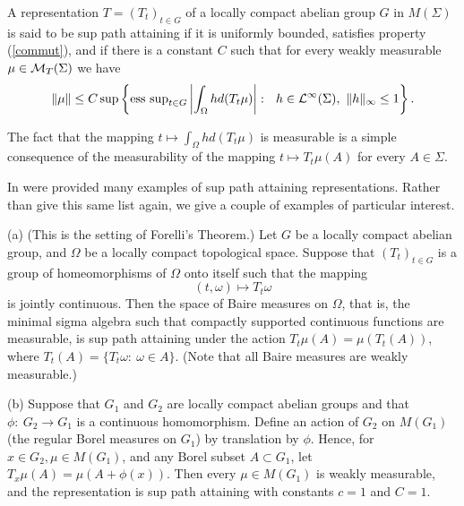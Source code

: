 \documentclass[12pt,leqno]{article}
\def\O{\Omega}
\def\cL{{\cal L}}
\begin{document}
\begin{defin}
A representation $T=(T_t)_{t\in G}$ of a locally compact abelian group
$G$ in $M(\Sigma)$ is said to be sup path attaining
if it is uniformly bounded, satisfies property (\ref{commut}), and if there 
is a constant $C$ such that for every weakly 
measurable $\mu\in {\cal M}_T(\Sigma)$ we have
\begin{equation}
\| \mu\| \leq C\sup \left\{
{\rm ess\ sup}_{t\in G} \left|
\int_\O h d (T_t\mu)
\right|
:\ \ h\in \cL^\infty(\Sigma),\ \|h\|_\infty\leq 1
\right\}.
\label{ineqhypa}
\end{equation}
\label{def hypa}
\end{defin}


The fact that the mapping $t\mapsto \int_\O h d (T_t\mu)$ is 
measurable is a simple consequence of
the measurability of the mapping $t\mapsto T_t\mu(A)$ for every
$A\in\Sigma$.  

In \cite{amss} were provided many examples of sup path attaining
representations.  Rather than give this same list again, we give
a couple of examples of particular interest.

\begin{ex}
{\rm (a) (This is the setting of Forelli's Theorem.)
Let $G$ be a locally compact abelian group, and
$\Omega$ be a locally compact topological
space.  Suppose that $\left( T_t\right)_{t\in G}$ is a
group of homeomorphisms of $\Omega$ onto itself
such that the mapping
$$(t,\omega)\mapsto T_t\omega$$
is jointly continuous.
Then the space of Baire measures on $\Omega$, that is, the minimal
sigma algebra such that compactly supported continuous functions are
measurable, is sup path attaining under the action
$T_t\mu(A)=\mu(T_t(A))$, where $T_t(A)=\{T_t\omega:\ \omega\in A\}$.
(Note that all Baire measures are weakly measurable.)

\noindent
(b)
Suppose that $G_1$ and $G_2$ are locally compact abelian groups and that
 $\phi:\ G_2\rightarrow G_1$ is a continuous homomorphism.
Define an action of $G_2$ on $M(G_1)$ (the regular Borel measures
on $G_1$) by translation by $\phi$.
Hence, for $x\in G_2, \mu\in M(G_1)$, and any
Borel subset $A\subset G_1$, let $T_x\mu(A)=\mu(A+\phi(x))$.
Then every $\mu\in M(G_1)$ is weakly measurable, and the
representation
is sup path attaining with constants $c = 1$ and $C = 1$.
}
\label{exhypa}
\end{ex}
\end{document}
